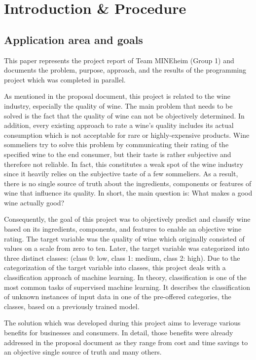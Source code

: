 \chapter{Introduction \& Procedure}
\section{Application area and goals}


This paper represents the project report of Team MINEheim (Group 1) and documents the problem, purpose, approach, and the results of the programming project which was completed in parallel. 

As mentioned in the proposal document, this project is related to the wine industry, especially the quality of wine. The main problem that needs to be solved is the fact that the quality of wine can not be objectively determined. In addition, every existing approach to rate a wine's quality includes its actual consumption which is not acceptable for rare or highly-expensive products. Wine sommeliers try to solve this problem by communicating their rating of the specified wine to the end consumer, but their taste is rather subjective and therefore not reliable. In fact, this constitutes a weak spot of the wine industry since it heavily relies on the subjective taste of a few sommeliers. As a result, there is no single source of truth about the ingredients, components or features of wine that influence its quality. In short, the main question is: What makes a good wine actually good?

Consequently, the goal of this project was to objectively predict and classify wine based on its ingredients, components, and features to enable an objective wine rating. The target variable was the quality of wine which originally consisted of values on a scale from zero to ten. Later, the target variable was categorized into three distinct classes: (class 0: low, class 1: medium, class 2: high). Due to the categorization of the target variable into classes, this project deals with a classification approach of machine learning. In theory, classification is one of the most common tasks of supervised machine learning. It describes the classification of unknown instances of input data in one of the pre-offered categories, the classes, based on a previously trained model. \citep{Novakovic2010}

The solution which was developed during this project aims to leverage various benefits for businesses and consumers. In detail, those benefits were already addressed in the proposal document as they range from cost and time savings to an objective single source of truth and many others. 